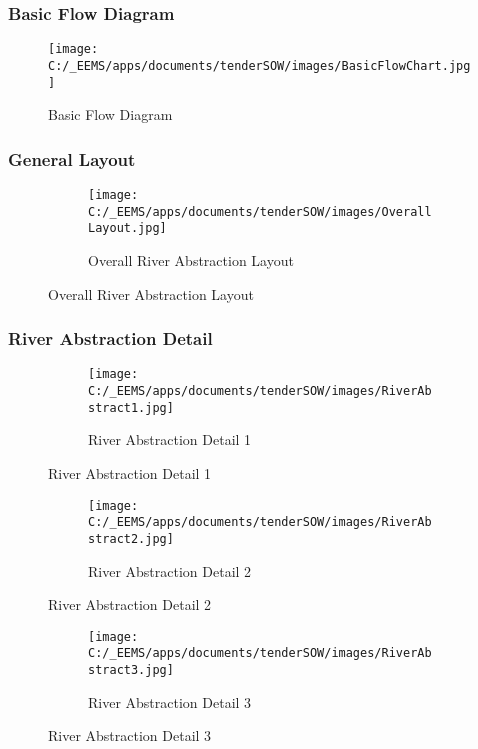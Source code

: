 \documentclass{article}%
\begin{document}
\subsubsection{Basic Flow Diagram}%
\label{ssubsec:BasicFlowDiagram}%


\begin{figure}[h!]%
\texttt{[image: C:/\_EEMS/apps/documents/tenderSOW/images/BasicFlowChart.jpg]}%
\centering%
\caption{Basic Flow Diagram}%
\centering%
\end{figure}

%
\subsubsection{General Layout}%
\label{ssubsec:GeneralLayout}%


\begin{figure}[h!]%
\begin{subfigure}[b]{0.45\linewidth}%
\texttt{[image: C:/\_EEMS/apps/documents/tenderSOW/images/OverallLayout.jpg]}%
\centering%
\caption{Overall River Abstraction Layout}%
\end{subfigure}%
\end{figure}

%
\newpage

%
\subsubsection{River Abstraction Detail}%
\label{ssubsec:RiverAbstractionDetail}%


\begin{figure}[h!]%
\begin{subfigure}[b]{0.45\linewidth}%
\texttt{[image: C:/\_EEMS/apps/documents/tenderSOW/images/RiverAbstract1.jpg]}%
\centering%
\caption{River Abstraction Detail 1}%
\end{subfigure}%
\end{figure}

%


\begin{figure}[h!]%
\begin{subfigure}[b]{0.45\linewidth}%
\texttt{[image: C:/\_EEMS/apps/documents/tenderSOW/images/RiverAbstract2.jpg]}%
\centering%
\caption{River Abstraction Detail 2}%
\end{subfigure}%
\end{figure}

%


\begin{figure}[h!]%
\begin{subfigure}[b]{0.45\linewidth}%
\texttt{[image: C:/\_EEMS/apps/documents/tenderSOW/images/RiverAbstract3.jpg]}%
\centering%
\caption{River Abstraction Detail 3}%
\end{subfigure}%
\end{figure}
\end{document}
